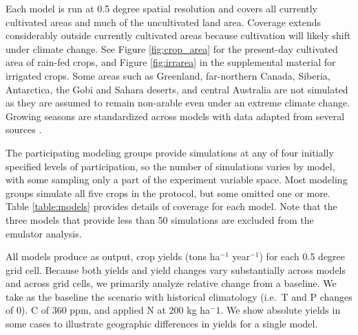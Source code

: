 \documentclass[preprint, 5p, times, twocolumn]{elsarticle}
\begin{document}
Each model is run at 0.5 degree spatial resolution and covers all currently cultivated areas and much of the uncultivated land area.  Coverage extends considerably outside currently cultivated areas because cultivation will likely shift under climate change. See Figure \ref{fig:crop_area} for the present-day cultivated area of rain-fed crops, and Figure \ref{fig:irrarea} in the supplemental material for irrigated crops. Some areas such as Greenland, far-northern Canada, Siberia, Antarctica, the Gobi and Sahara deserts, and central Australia are not simulated as they are assumed to remain non-arable even under an extreme climate change. Growing seasons are standardized across models with data adapted from several sources \citep{Sacks2010, Portmann2008, Portmann2010}.

The participating modeling groups provide simulations at any of four initially specified levels of participation, so the number of simulations varies by model, with some sampling only a part of the experiment variable space. Most modeling groups simulate all five crops in the protocol, but some omitted one or more. Table \ref{table:models} provides details of coverage for each model. Note that the three models that provide less than 50 simulations are excluded from the emulator analysis. 

All models produce as output, crop yields (tons ha$^{-1}$ year$^{-1}$) for each 0.5 degree grid cell. Because both yields and yield changes vary substantially across models and across grid cells, we primarily analyze relative change from a baseline. We take as the baseline the scenario with historical climatology (i.e.\ T and P changes of 0). C of 360 ppm, and applied N at 200 kg ha$^-1$.  We show absolute yields in some cases to illustrate geographic differences in yields for a single model. 
\end{document}

